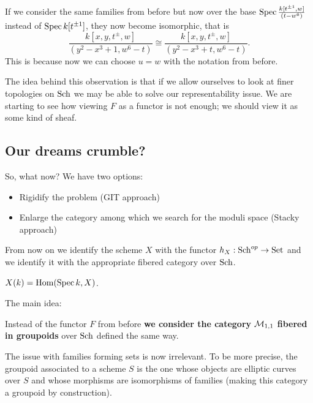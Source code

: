 \begin{example}
If we consider the same families from before but now over the base $\operatorname{Spec}\frac{k[t^{\pm1},w]}{(t-w^6)}$ instead of $\operatorname{Spec} k[t^{\pm 1}]$, they now become isomorphic, that is
\[\frac{k[x,y,t^\pm,w]}{(y^2-x^3+1,w^6-t)}\cong \frac{k[x,y,t^\pm,w]}{(y^2-x^3+t,w^6-t)}.\]
This is because now we can choose $u=w$ with the notation from before. 

The idea behind this observation is that if we allow ourselves to look at finer topologies on $\mathrm{Sch}$ we may be able to solve our representability issue. We are starting to see how viewing $F$ as a functor is not enough; we should view it as some kind of sheaf.
\end{example}


\subsection{Our dreams crumble?}

So, what now? We have two options:
\begin{itemize}
    \item Rigidify the problem (GIT approach)
    \item Enlarge the category among which we search for the moduli space (Stacky approach) 
\end{itemize}

\begin{notation}
From now on we identify the scheme $X$ with the functor $h_X:\mathrm{Sch}^{op}\to \mathrm{Set}$ and we identify it with the appropriate fibered category over $\mathrm{Sch}$. 
\end{notation}
\begin{remark}
$X(k)=\operatorname{Hom}(\operatorname{Spec} k,X)$.
\end{remark}

\begin{center}
	{\Large The main idea:}
\end{center}
Instead of the functor $F$ from before \textbf{we consider the category} $\mathcal{M}_{1,1}$ \textbf{fibered in groupoids} over $\mathrm{Sch}$ defined the same way.

\begin{remark}
The issue with families forming sets is now irrelevant. To be more precise, the groupoid associated to a scheme $S$ is the one whose objects are elliptic curves over $S$ and whose morphisms are isomorphisms of families (making this category a groupoid by construction).
\end{remark}


